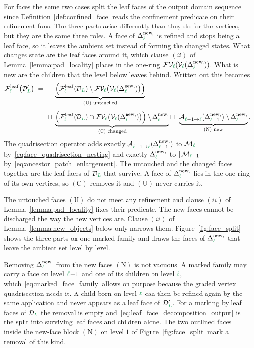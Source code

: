\documentclass[a4paper, 12pt]{article}
\makeatletter
\newcommand{\green}{\color{ForestGreen}}
\newcommand{\V}{\mathcal{V}}
\newcommand{\F}{\mathcal{F}}
\DeclareRobustCommand{\simplexsubsetNew}[2][]{\Delta^{\mathrm{new}\ifx\@empty#1\@empty\else,#1\fi}_{#2}}
\newcommand{\FVl}[1]{\F\V_{#1}}
\renewcommand{\l}{{\green\ell}}
\renewcommand{\L}{{\green L}}
\newcommand{\Aop}[3]{\mathcal{A}^{#1}_{{#2} \to {#3}}}
\newcommand{\M}{\mathcal{M}}
\theoremstyle{definition}
\theoremstyle{plain}
\numberwithin{equation}{section}
\newcommand{\ancestorPatch}[1]{\lceil #1 \rceil}
\DeclareRobustCommand{\domseq}[1][]{\mathcal{D}\ifx\@empty#1\@empty\else_{#1}\fi}
\newcommand{\leafF}[1]{\F^{\mathrm{leaf}}_{#1}}             %
\makeatother
\begin{document}
For faces the same two cases split the leaf faces of the output domain sequence since Definition~\ref{def:confined_face} reads the confinement predicate on their refinement fans. The three parts arise differently than they do for the vertices, but they are the same three roles. A face of $\simplexsubsetNew{\l}$ is refined and stops being a leaf face, so it leaves the ambient set instead of forming the changed states. What changes state are the leaf faces around it, which clause $(ii)$ of Lemma~\ref{lemma:pad_locality} places in the one-ring $\FVl{\l} ( \V_\l ( \simplexsubsetNew{\l} ) )$. What is new are the children that the level below leaves behind. Written out this becomes
\begin{equation}
    \label{eq:leaf_face_decomposition_output}
    \begin{split}
        \leafF{\l} \big( \domseq[\L]' \big) \; = \;\;\;\;\;\; & \underbrace{\Big( \leafF{\l}(\domseq[\L]) \setminus \FVl{\l} \big( \V_\l ( \simplexsubsetNew{\l} ) \big) \Big)}_{(\mathrm{U}) \text{ untouched}}  \\[4pt]
        \sqcup \; & \underbrace{\Big( \leafF{\l}(\domseq[\L]) \cap \FVl{\l} \big( \V_\l ( \simplexsubsetNew{\l} ) \big) \Big) \setminus \simplexsubsetNew{\l}}_{(\mathrm{C}) \text{ changed}} \sqcup \;\; \underbrace{\Aop{}{\l-1}{\l} \big( \simplexsubsetNew{\l-1} \big) \setminus \simplexsubsetNew{\l}}_{(\mathrm{N}) \text{ new}} .
    \end{split}
\end{equation}
The quadrisection operator adds exactly $\Aop{}{\l-1}{\l}(\simplexsubsetNew{\l-1})$ to $\M_\l$ by~\eqref{eq:face_quadrisection_nesting} and exactly $\simplexsubsetNew{\l}$ to $\ancestorPatch{\M_{\l+1}}$ by~\eqref{eq:ancestor_patch_enlargement}. The untouched and the changed faces together are the leaf faces of $\domseq[\L]$ that survive. A face of $\simplexsubsetNew{\l}$ lies in the one-ring of its own vertices, so $(\mathrm{C})$ removes it and $(\mathrm{U})$ never carries it.

The untouched faces $(\mathrm{U})$ do not meet any refinement and clause $(ii)$ of Lemma~\ref{lemma:pad_locality} fixes their predicate. The new faces cannot be discharged the way the new vertices are. Clause $(ii)$ of Lemma~\ref{lemma:new_objects} below only narrows them. Figure~\ref{fig:face_split} shows the three parts on one marked family and draws the faces of $\simplexsubsetNew{\l}$ that leave the ambient set level by level.

Removing $\simplexsubsetNew{\l}$ from the new faces $(\mathrm{N})$ is not vacuous. A marked family may carry a face on level $\l\!-\!1$ and one of its children on level $\l$, which~\eqref{eq:marked_face_family} allows on purpose because the graded vertex quadrisection needs it. A child born on level $\l$ can then be refined again by the same application and never appears as a leaf face of $\domseq[\L]'$. For a marking by leaf faces of $\domseq[\L]$ the removal is empty and~\eqref{eq:leaf_face_decomposition_output} is the split into surviving leaf faces and children alone. The two outlined faces inside the new-face block $(\mathrm{N})$ on level $1$ of Figure~\ref{fig:face_split} mark a removal of this kind.
\end{document}
